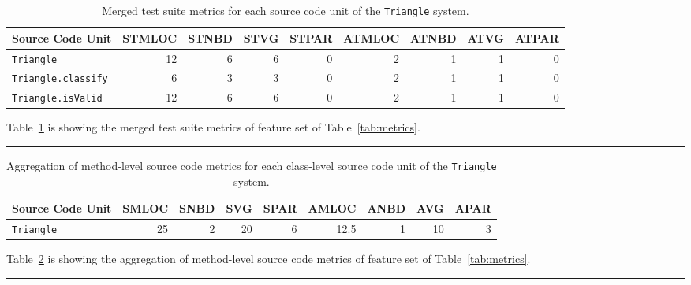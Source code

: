 \begin{landscape}
  \begin{table}[h]
    \centering
    \begin{tabular}{|l|r|r|r|r|r|r|r|r|}
      \hline
      \rowcolor[RGB]{169,196,223}
      \textbf{Source Code Unit} & \textbf{STMLOC} & \textbf{STNBD} & \textbf{STVG} & \textbf{STPAR} & \textbf{ATMLOC} & \textbf{ATNBD} & \textbf{ATVG} & \textbf{ATPAR}  \\
      \hline \texttt{Triangle} & 12 & 6 & 6 & 0 & 2 & 1 & 1 & 0 \\
      \hline \texttt{Triangle.classify} & 6 & 3 & 3 & 0 & 2 & 1 & 1 & 0 \\
      \hline \texttt{Triangle.isValid} & 12 & 6 & 6 & 0 & 2 & 1 & 1 & 0 \\
      \hline
    \end{tabular}
    \caption{Merged test suite metrics for each source code unit of the \texttt{Triangle} system.}
    \vspace{1mm}
    \footnotesize{Table~\ref{tab:triangle_merge_test_metrics} is showing the merged test suite metrics of feature set  of Table~\ref{tab:metrics}.}
    \vspace{2mm}
    \hrule
    \label{tab:triangle_merge_test_metrics}
  \end{table}

  \begin{table}[h]
    \centering
    \begin{tabular}{|l|r|r|r|r|r|r|r|r|}
      \hline
      \rowcolor[RGB]{169,196,223}
      \textbf{Source Code Unit} & \textbf{SMLOC} & \textbf{SNBD} & \textbf{SVG} & \textbf{SPAR} & \textbf{AMLOC} & \textbf{ANBD} & \textbf{AVG} & \textbf{APAR}  \\
      \hline \texttt{Triangle} & 25 & 2 & 20 & 6 & 12.5 & 1 & 10 & 3 \\
      \hline
    \end{tabular}
    \caption{Aggregation of method-level source code metrics for each class-level source code unit of the \texttt{Triangle} system.}
    \vspace{1mm}
    \footnotesize{Table~\ref{tab:triangle_aggregate_metrics} is showing the aggregation of method-level source code metrics of feature set  of Table~\ref{tab:metrics}.}
    \vspace{2mm}
    \hrule
    \label{tab:triangle_aggregate_metrics}
  \end{table}
\end{landscape}



